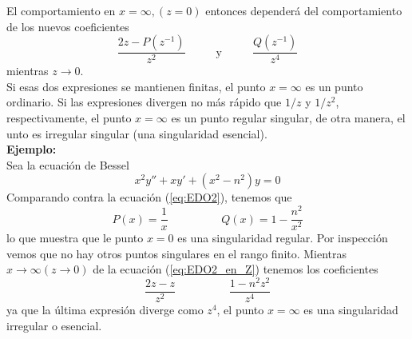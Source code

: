 El comportamiento en $x=\infty, (z=0)$ entonces dependerá del comportamiento de los nuevos coeficientes
\[ \dfrac{2z - P(z^{-1})}{z^{2}} \hspace{1cm} \text{ y } \hspace{1cm} \dfrac{Q(z^{-1})}{z^{4}}\]
mientras $z \to 0$.
\\
Si esas dos expresiones se mantienen finitas, el punto $x=\infty$ es un punto ordinario. Si las expresiones divergen no más rápido que $1/z$ y $1/z^{2}$, respectivamente, el punto $x=\infty$ es un punto regular singular, de otra manera, el unto es irregular singular (una singularidad esencial).
\\
\textbf{Ejemplo:}
\\
Sea la ecuación de Bessel
\begin{equation}
x^{2} y'' + xy' + (x^{2} - n^{2})y = 0
\end{equation}
Comparando contra la ecuación (\ref{eq:EDO2}), tenemos que
\[ P(x) =  \dfrac{1}{x} \hspace{2cm} Q(x) = 1 - \dfrac{n^{2}}{x^{2}}\]
lo que muestra que le punto $x=0$ es una singularidad regular. Por inspección vemos que no hay otros puntos singulares en el rango finito. Mientras $x \to \infty (z \to 0)$ de la ecuación (\ref{eq:EDO2_en_Z}) tenemos los coeficientes
\[ \dfrac{2z - z}{z^{2}} \hspace{2cm} \dfrac{1 - n^{2} z^{2}}{z^{4}}\]
ya que la última expresión diverge como $z^{4}$, el punto $x= \infty$ es una singularidad irregular o esencial. 
